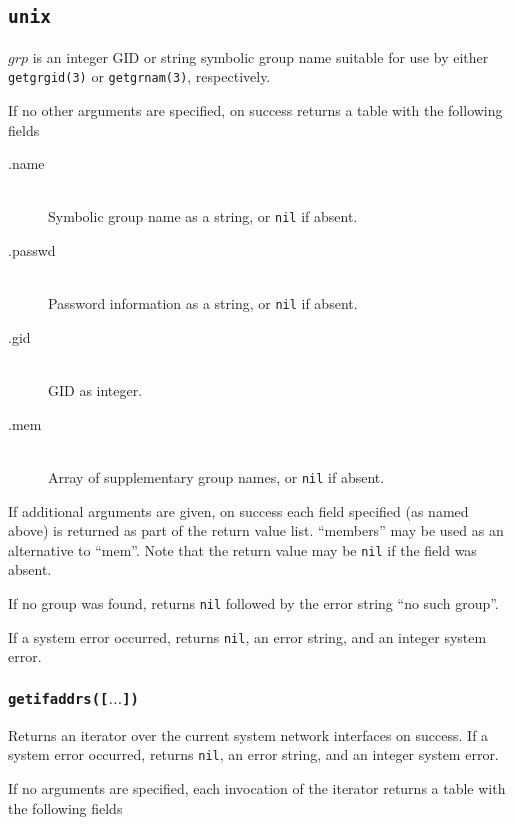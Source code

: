 \documentclass[11pt, oneside]{memoir}
\newcommand*{\nil}[0]{\texttt{nil}\xspace}
\newcommand*{\syscall}[1]{\texttt{#1}\xspace}
\newcommand*{\fn}[1]{\texttt{#1}\xspace}
\newcounter{toccols}
\newenvironment{Module}[1]{
	\subsection{\texttt{#1}}
	\addtocontents{toc}{
		\protect\begin{multicols}{\value{toccols}}
	}
}{
	\addtocontents{toc}{\protect\end{multicols}}
}
\begin{document}
\begin{Module}{unix}
$grp$ is an integer GID or string symbolic group name suitable for use by either \syscall{getgrgid(3)} or \syscall{getgrnam(3)}, respectively.

If no other arguments are specified, on success returns a table with the following fields

\begin{description}
\item[.name] \hfill \\
Symbolic group name as a string, or \nil if absent.
\item[.passwd] \hfill \\
Password information as a string, or \nil if absent.
\item[.gid] \hfill \\
GID as integer.
\item[.mem] \hfill \\
Array of supplementary group names, or \nil if absent.
\end{description}

If additional arguments are given, on success each field specified (as named above) is returned as part of the return value list. ``members'' may be used as an alternative to ``mem''. Note that the return value may be \nil if the field was absent.

If no group was found, returns \nil followed by the error string ``no such group''.

If a system error occurred, returns \nil, an error string, and an integer system error.

\subsubsection[\fn{getifaddrs}]{\fn{getifaddrs([$\ldots$])}}

Returns an iterator over the current system network interfaces on success. If a system error occurred, returns \nil, an error string, and an integer system error.

If no arguments are specified, each invocation of the iterator returns a table with the following fields


\end{Module}
\end{document}
